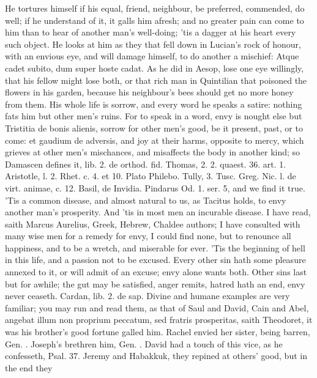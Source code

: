 {He tortures himself if his equal, friend, neighbour, be preferred,
commended, do well; if he understand of it, it galls him afresh; and no
greater pain can come to him than to hear of another man's well-doing;
'tis a dagger at his heart every such object. He looks at him as they
that fell down in Lucian's rock of honour, with an envious eye, and
will damage himself, to do another a mischief: Atque cadet subito, dum
super hoste cadat. As he did in Aesop, lose one eye willingly, that his
fellow might lose both, or that rich man in Quintilian that
poisoned the flowers in his garden, because his neighbour's bees should
get no more honey from them. His whole life is sorrow, and every word
he speaks a satire: nothing fats him but other men's ruins. For to
speak in a word, envy is nought else but Tristitia de bonis alienis,
sorrow for other men's good, be it present, past, or to come: et
gaudium de adversis, and joy at their harms, opposite to mercy,
which grieves at other men's mischances, and misaffects the body
in another kind; so Damascen defines it, lib. 2. de orthod. fid.
Thomas, 2. 2. quaest. 36. art. 1. Aristotle, l. 2. Rhet. c. 4. et 10.
Plato Philebo. Tully, 3. Tusc. Greg. Nic. l. de virt. animae, c. 12.
Basil, de Invidia. Pindarus Od. 1. ser. 5, and we find it true. 'Tis a
common disease, and almost natural to us, as Tacitus holds, to
envy another man's prosperity. And 'tis in most men an incurable
disease. I have read, saith Marcus Aurelius, Greek, Hebrew,
Chaldee authors; I have consulted with many wise men for a remedy for
envy, I could find none, but to renounce all happiness, and to be a
wretch, and miserable for ever. 'Tis the beginning of hell in this
life, and a passion not to be excused. Every other sin hath some
pleasure annexed to it, or will admit of an excuse; envy alone wants
both. Other sins last but for awhile; the gut may be satisfied, anger
remits, hatred hath an end, envy never ceaseth. Cardan, lib. 2. de sap.
Divine and humane examples are very familiar; you may run and read
them, as that of Saul and David, Cain and Abel, angebat illum non
proprium peccatum, sed fratris prosperitas, saith Theodoret, it was his
brother's good fortune galled him. Rachel envied her sister, being
barren, Gen. . Joseph's brethren him, Gen. . David had a touch
of this vice, as he confesseth, Psal. 37. Jeremy and
Habakkuk, they repined at others' good, but in the end they
}
